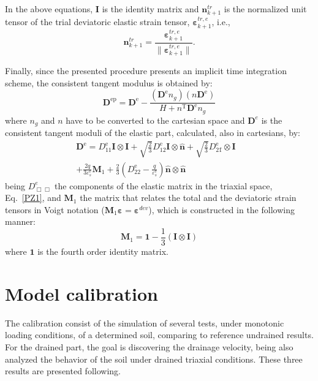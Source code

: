 \documentclass[preprint,12pt,a4paper]{elsarticle}
\begin{document}
In the above equations, $\boldsymbol{I}$ is the identity matrix and $\boldsymbol{n}^{tr}_{k+1}$ is the normalized unit tensor of the trial deviatoric elastic strain tensor, $\boldsymbol{\varepsilon}^{tr, e}_{k+1}$, i.e.,
\begin{equation}\label{eq_dp9}
\boldsymbol{n}^{tr}_{k+1} =\frac{\boldsymbol{\varepsilon}^{tr,e}_{k+1}}{\|\boldsymbol{\varepsilon}^{tr,e}_{k+1}\|}.
\end{equation}

Finally, since the presented procedure presents an implicit time integration scheme, the consistent tangent modulus is obtained by:
\begin{equation}
\boldsymbol{D}^{\mathrm{ep}}=\boldsymbol{D}^{\mathrm{e}}-\frac{\left(\boldsymbol{D}^{\mathrm{e}} n_{g}\right)\left(n \boldsymbol{D}^{\mathrm{e}}\right)}{H+n^{\mathrm{T}} \boldsymbol{D}^{\mathrm{e}} n_{g}}
\end{equation}
where $n_g$ and $n$ have to be converted to the cartesian space and $\boldsymbol{D}^e$ is the consistent tangent moduli of the elastic part, calculated, also in cartesians, by:
\begin{eqnarray}
\boldsymbol{D}^{\mathrm{e}}=D_{11}^{\mathrm{e}} \boldsymbol{I}\otimes \boldsymbol{I}+\sqrt{\frac{2}{3}} D_{12}^{\mathrm{e}} \boldsymbol{I} \otimes \hat{\boldsymbol{n}}+\sqrt{\frac{2}{3}} D_{21}^{\mathrm{e}} \hat{\boldsymbol{}} \otimes \boldsymbol{I} &\nonumber\\ 
+\frac{2 q}{3 \varepsilon_{s}^{\mathrm{e}}} \mathbf{M}_1 +\frac{2}{3}\left(  D_{22}^{\mathrm{e}} - \frac{q}{ \varepsilon_{s}^{\mathrm{e}}}\right)\hat{\boldsymbol{n}} \otimes \hat{\boldsymbol{n}}&
\end{eqnarray}
being $D^e_{\Box\Box}$ the components of the elastic matrix in the triaxial space, Eq.~\eqref{PZ1}, and $\mathbf{M}_1 $ the matrix that relates the total and the deviatoric strain tensors in Voigt notation ($\mathbf{M}_1 \boldsymbol{\varepsilon}= \boldsymbol{\varepsilon}^{dev}$), which is constructed in the following manner:
\begin{equation}
\mathbf{M}_1 = \boldsymbol{1} - \frac{1}{3	}\left( \boldsymbol{I} \otimes \boldsymbol{I} \right)
\end{equation}
where $\boldsymbol{1}$ is the fourth order identity matrix. 

\section{Model calibration}
\label{sec:3}
The calibration consist of the simulation of several tests, under monotonic loading conditions, of a determined soil, comparing to reference undrained results. For the drained part, the goal is discovering the drainage velocity, being also analyzed the behavior of the soil under drained triaxial conditions. These three results are presented following.
\end{document}
